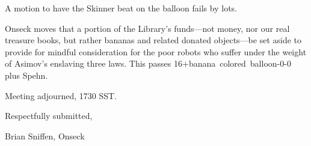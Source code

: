 \documentclass[10pt]{article}
\newcommand{\ps}{ plus Spehn\xspace}
\begin{document}
A motion to have the Skinner beat on the balloon fails by lots.

Onseck moves that a portion of the Library's funds---not money, nor
our real treasure books, but rather bananas and related donated
objects---be set aside to provide for mindful consideration for the
poor robots who suffer under the weight of Asimov's enslaving three
laws.  This passes 16+banana~colored~balloon-0-0\ps .

\vspace{12pt}

\noindent
Meeting adjourned, 1730 SST.

\vspace{18pt}

\centerline{Respectfully submitted,}
\centerline{Brian Sniffen, Onseck}
\end{document}
